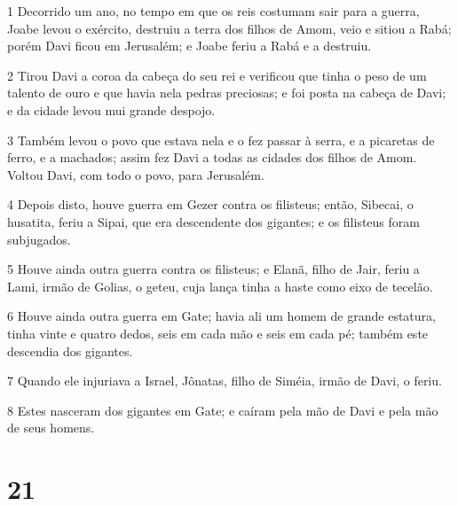 \par 1 Decorrido um ano, no tempo em que os reis costumam sair para a guerra, Joabe levou o exército, destruiu a terra dos filhos de Amom, veio e sitiou a Rabá; porém Davi ficou em Jerusalém; e Joabe feriu a Rabá e a destruiu.
\par 2 Tirou Davi a coroa da cabeça do seu rei e verificou que tinha o peso de um talento de ouro e que havia nela pedras preciosas; e foi posta na cabeça de Davi; e da cidade levou mui grande despojo.
\par 3 Também levou o povo que estava nela e o fez passar à serra, e a picaretas de ferro, e a machados; assim fez Davi a todas as cidades dos filhos de Amom. Voltou Davi, com todo o povo, para Jerusalém.
\par 4 Depois disto, houve guerra em Gezer contra os filisteus; então, Sibecai, o husatita, feriu a Sipai, que era descendente dos gigantes; e os filisteus foram subjugados.
\par 5 Houve ainda outra guerra contra os filisteus; e Elanã, filho de Jair, feriu a Lami, irmão de Golias, o geteu, cuja lança tinha a haste como eixo de tecelão.
\par 6 Houve ainda outra guerra em Gate; havia ali um homem de grande estatura, tinha vinte e quatro dedos, seis em cada mão e seis em cada pé; também este descendia dos gigantes.
\par 7 Quando ele injuriava a Israel, Jônatas, filho de Siméia, irmão de Davi, o feriu.
\par 8 Estes nasceram dos gigantes em Gate; e caíram pela mão de Davi e pela mão de seus homens.

\chapter{21}

